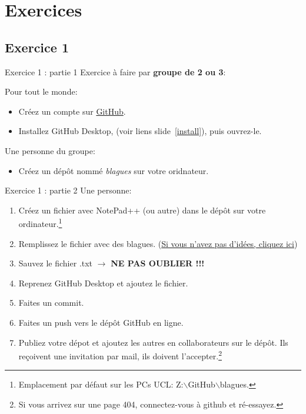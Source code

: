 \documentclass{beamer}
\begin{document}
\section{Exercices}
\subsection{Exercice 1}
\begin{frame}{Exercice 1 : partie 1}
Exercice à faire par \textbf{groupe de 2 ou 3}:

Pour tout le monde:
\begin{itemize}
    \item Créez un compte sur \href{https://github.com}{GitHub}.
    \item Installez GitHub Desktop, (voir liens slide~\ref{install}), puis ouvrez-le.
\end{itemize}
Une personne du groupe:
\begin{itemize}
    \item Créez un dépôt nommé \textit{blagues} sur votre oridnateur.
\end{itemize}
\end{frame}

\begin{frame}{Exercice 1 : partie 2}
    Une personne:
    \begin{enumerate}
        \item Créez un fichier avec NotePad++ (ou autre)
            dans le dépôt sur votre ordinateur.\footnote{Emplacement par défaut sur les PCs UCL:
            Z:$\backslash$GitHub$\backslash$blagues.}
        \item Remplissez le fichier avec des blagues.
            (\href{https://linuxfr.org/news/blagues-d-informaticiens}{Si vous
            n'avez pas d'idées, cliquez ici})
        \item Sauvez le fichier .txt $\rightarrow$ \textbf{NE PAS OUBLIER !!!}
        \item Reprenez GitHub Desktop et ajoutez le fichier.
        \item Faites un commit.
        \item Faites un push vers le dépôt GitHub en ligne.
        \item Publiez votre dépot et ajoutez les autres en collaborateurs sur le dépôt. Ils reçoivent une invitation par mail, ils doivent
            l'accepter.\footnote{Si vous arrivez sur une page 404, connectez-vous à github et ré-essayez.}
    \end{enumerate}
    \vspace{10pt}
\end{frame}
\end{document}
